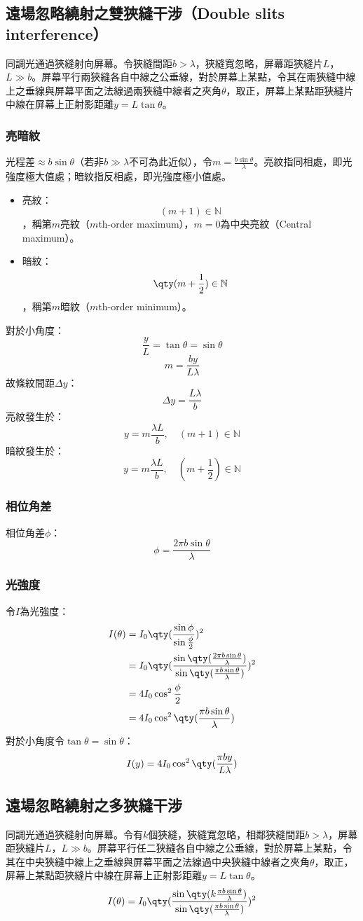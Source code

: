 \documentclass[a4paper,12pt]{report}
\begin{document}
\subsection{遠場忽略繞射之雙狹縫干涉（Double slits interference）}
同調光通過狹縫射向屏幕。令狹縫間距$b>\lambda$，狹縫寬忽略，屏幕距狹縫片$L$，$L\gg b$。屏幕平行兩狹縫各自中線之公垂線，對於屏幕上某點，令其在兩狹縫中線上之垂線與屏幕平面之法線過兩狹縫中線者之夾角$\theta$，取正，屏幕上某點距狹縫片中線在屏幕上正射影距離$y=L\tan\theta$。
\subsubsection{亮暗紋}
光程差$\approx b\sin\theta$（若非$b\gg \lambda$不可為此近似），令$m=\frac{b\sin\theta}{\lambda}$。亮紋指同相處，即光強度極大值處；暗紋指反相處，即光強度極小值處。
\begin{itemize}
\item 亮紋：
\[(m+1)\in\mathbb{N}\]
，稱第$m$亮紋（$m$th-order maximum），$m=0$為中央亮紋（Central maximum）。
\item 暗紋：
\[\qty(m+\frac{1}{2})\in\mathbb{N}\]
，稱第$m$暗紋（$m$th-order minimum）。
\end{itemize}
對於小角度：
\[\frac{y}{L}=\tan\theta=\sin\theta\]
\[m=\frac{by}{L\lambda}\]
故條紋間距$\Delta y$：
\[\Delta y=\frac{L\lambda}{b}\]
亮紋發生於：
\[y=m\frac{\lambda L}{b},\quad (m+1)\in\mathbb{N}\]
暗紋發生於：
\[y=m\frac{\lambda L}{b},\quad (m+\frac{1}{2})\in\mathbb{N}\]
\subsubsection{相位角差}
相位角差$\phi$：
\[\phi=\frac{2\pi b\sin\theta}{\lambda}\]
\subsubsection{光強度}
令$I$為光強度：
\[\begin{aligned}
I(\theta) &= I_0\qty(\frac{\sin\phi}{\sin\frac{\phi}{2}})^2\\
&= I_0\qty(\frac{\sin\qty(\frac{2\pi b\sin\theta}{\lambda})}{\sin\qty(\frac{\pi b\sin\theta}{\lambda})})^2\\
&=4I_0\cos^2\frac{\phi}{2}\\
&=4I_0\cos^2\qty(\frac{\pi b\sin\theta}{\lambda})
\end{aligned}\]
對於小角度令$\tan\theta=\sin\theta$：
\[I(y)=4I_0\cos^2\qty(\frac{\pi by}{L\lambda})\]
\subsection{遠場忽略繞射之多狹縫干涉}
同調光通過狹縫射向屏幕。令有$k$個狹縫，狹縫寬忽略，相鄰狹縫間距$b>\lambda$，屏幕距狹縫片$L$，$L\gg b$。屏幕平行任二狹縫各自中線之公垂線，對於屏幕上某點，令其在中央狹縫中線上之垂線與屏幕平面之法線過中央狹縫中線者之夾角$\theta$，取正，屏幕上某點距狹縫片中線在屏幕上正射影距離$y=L\tan\theta$。
\[I(\theta) = I_0\qty(\frac{\sin\qty(k\frac{\pi b\sin\theta}{\lambda})}{\sin\qty(\frac{\pi b\sin\theta}{\lambda})})^2\]
\end{document}
